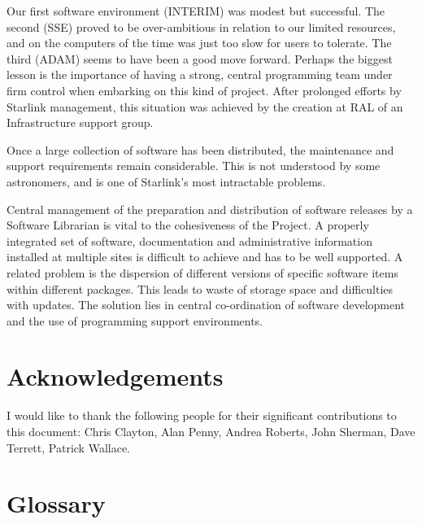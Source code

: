 Our first software environment (INTERIM) was modest but successful.
The second (SSE) proved to be over-ambitious in relation to our
limited resources, and on the computers of the time was just too slow for users
to tolerate.
The third (ADAM) seems to have been a good move forward.
Perhaps the biggest lesson is the importance of having a strong, central
programming team under firm control when embarking on this kind of project.
After prolonged efforts by Starlink management, this situation was
achieved by the creation at RAL of an Infrastructure support group.

Once a large collection of software has been distributed, the maintenance
and support requirements remain considerable.
This is not understood by some astronomers, and is one of Starlink's most
intractable problems.

Central management of the preparation and distribution of software releases
by a Software Librarian is vital to the cohesiveness of the Project.
A properly integrated set of software, documentation and administrative
information installed at multiple sites is difficult to achieve and has to
be well supported.
A related problem is the dispersion of different versions of specific software
items within different packages.
This leads to waste of storage space and difficulties with updates.
The solution lies in central co-ordination of software development and the
use of programming support environments.

\section*{Acknowledgements}

I would like to thank the following people for their significant contributions
to this document:
Chris Clayton,
Alan Penny,
Andrea Roberts,
John Sherman,
Dave Terrett,
Patrick Wallace.

\newpage

\appendix

\section{Glossary}

\vspace{-6mm}

